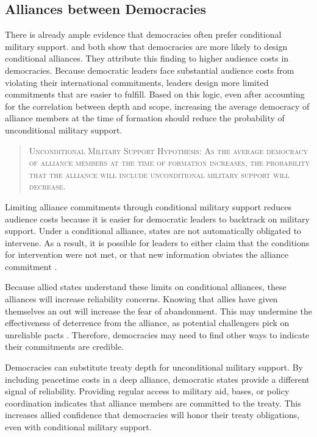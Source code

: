 \documentclass[12pt]{article}
\begin{document}
\subsection{Alliances between Democracies}


There is already ample evidence that democracies often prefer conditional military support. 
\citet{Mattes2012} and \citet{Chibaetal2015} both show that democracies are more likely to design conditional alliances. 
They attribute this finding to higher audience costs in democracies. 
Because democratic leaders face substantial audience costs from violating their international commitments, leaders design more limited commitments that are easier to fulfill. 
Based on this logic, even after accounting for the correlation between depth and scope, increasing the average democracy of alliance members at the time of formation should reduce the probability of unconditional military support.


\begin{quote}
\textsc{Unconditional Military Support Hypothesis: As the average democracy of alliance members at the time of formation increases, the probability that the alliance will include unconditional military support will decrease.}
\end{quote} 


Limiting alliance commitments through conditional military support reduces audience costs because it is easier for democratic leaders to backtrack on military support. 
Under a conditional alliance, states are not automatically obligated to intervene. 
As a result, it is possible for leaders to either claim that the conditions for intervention were not met, or that new information obviates the alliance commitment \citep{LevenduskyHorowitz2012}. 


Because allied states understand these limits on conditional alliances, these alliances will increase reliability concerns. 
Knowing that allies have given themselves an out will increase the fear of abandonment. 
This may undermine the effectiveness of deterrence from the alliance, as potential challengers pick on unreliable pacts \citep{Smith1995}. 
Therefore, democracies may need to find other ways to indicate their commitments are credible. 


Democracies can substitute treaty depth for unconditional military support. 
By including peacetime costs in a deep alliance, democratic states provide a different signal of reliability. 
Providing regular access to military aid, bases, or policy coordination indicates that alliance members are committed to the treaty. 
This increases allied confidence that democracies will honor their treaty obligations, even with conditional military support. 
\end{document}
